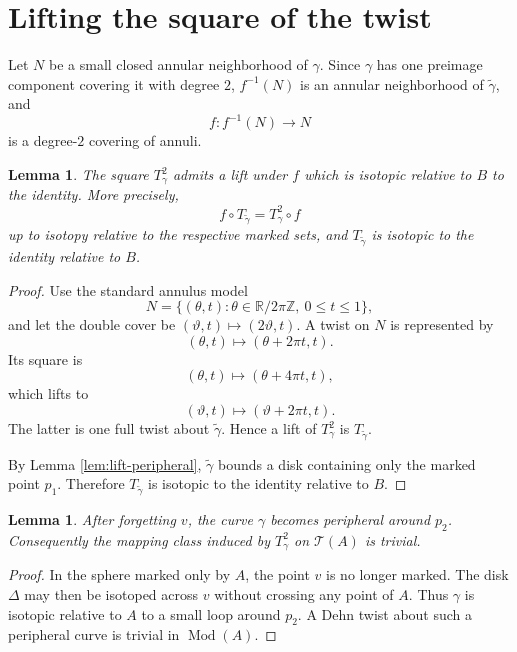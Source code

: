 \documentclass[11pt]{article}
\newcommand{\Teich}{\mathcal T}
\newcommand{\Mod}{\operatorname{Mod}}
\newtheorem{lemma}[theorem]{Lemma}
\theoremstyle{remark}
\begin{document}
\section{Lifting the square of the twist}

Let \(N\) be a small closed annular neighborhood of \(\gamma\).
Since \(\gamma\) has one preimage component covering it with degree
\(2\), \(f^{-1}(N)\) is an annular neighborhood of
\(\widetilde\gamma\), and
\[
f:f^{-1}(N)\longrightarrow N
\]
is a degree-\(2\) covering of annuli.

\begin{lemma}\label{lem:twist-lift}
The square \(T_\gamma^2\) admits a lift under \(f\) which is
isotopic relative to \(B\) to the identity.  More precisely,
\[
f\circ T_{\widetilde\gamma}
   =T_\gamma^2\circ f
\]
up to isotopy relative to the respective marked sets, and
\(T_{\widetilde\gamma}\) is isotopic to the identity relative to
\(B\).
\end{lemma}

\begin{proof}
Use the standard annulus model
\[
N=\{(\theta,t):\theta\in\mathbb R/2\pi\mathbb Z,\ 0\le t\le1\},
\]
and let the double cover be \((\vartheta,t)\mapsto(2\vartheta,t)\).
A twist on \(N\) is represented by
\[
(\theta,t)\longmapsto(\theta+2\pi t,t).
\]
Its square is
\[
(\theta,t)\longmapsto(\theta+4\pi t,t),
\]
which lifts to
\[
(\vartheta,t)\longmapsto(\vartheta+2\pi t,t).
\]
The latter is one full twist about \(\widetilde\gamma\).  Hence a
lift of \(T_\gamma^2\) is \(T_{\widetilde\gamma}\).

By Lemma \ref{lem:lift-peripheral}, \(\widetilde\gamma\) bounds a
disk containing only the marked point \(p_1\).  Therefore
\(T_{\widetilde\gamma}\) is isotopic to the identity relative to
\(B\).
\end{proof}

\begin{lemma}\label{lem:forget-peripheral}
After forgetting \(v\), the curve \(\gamma\) becomes peripheral
around \(p_2\).  Consequently the mapping class induced by
\(T_\gamma^2\) on \(\Teich(A)\) is trivial.
\end{lemma}

\begin{proof}
In the sphere marked only by \(A\), the point \(v\) is no longer
marked.  The disk \(\Delta\) may then be isotoped across \(v\)
without crossing any point of \(A\).  Thus \(\gamma\) is isotopic
relative to \(A\) to a small loop around \(p_2\).  A Dehn twist
about such a peripheral curve is trivial in \(\Mod(A)\).
\end{proof}
\end{document}
